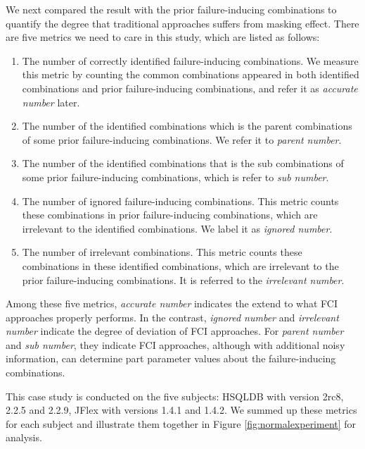 \documentclass{sig-alternate}
\begin{document}
We next compared the result with the prior failure-inducing combinations to quantify the degree that traditional approaches suffers from masking effect. There are five metrics we need to care in this study, which are listed as follows:
 \begin{enumerate}
 \item The number of correctly identified failure-inducing combinations. We measure this metric by counting the common combinations appeared in both identified combinations and prior failure-inducing combinations, and refer it as \emph{accurate number} later.
 \item The number of the identified combinations which is the parent combinations of some prior failure-inducing combinations. We refer it to \emph{parent number}.
 \item The number of the identified combinations that is the sub combinations of some prior failure-inducing combinations, which is refer to \emph{sub number}.
 \item The number of ignored failure-inducing combinations. This metric counts these combinations in prior failure-inducing combinations, which are irrelevant to the identified combinations. We label it as \emph{ignored number}.
 \item The number of irrelevant combinations. This metric counts these combinations in these identified combinations, which are irrelevant to the prior failure-inducing combinations. It is referred to the \emph{irrelevant number}.

\end{enumerate}

Among these five metrics,  \emph{accurate number} indicates the extend to what FCI approaches properly performs. In the contrast, \emph{ignored number} and \emph{irrelevant number} indicate the degree of deviation of FCI approaches. For \emph{parent number} and \emph{sub number}, they indicate FCI approaches, although with additional noisy information, can determine part parameter values about the failure-inducing combinations.


This case study is conducted on the five subjects: HSQLDB with version 2rc8, 2.2.5 and 2.2.9, JFlex with versions 1.4.1 and 1.4.2. We summed up these metrics for each subject and illustrate them together in Figure \ref{fig:normalexperiment} for analysis.
\end{document}
